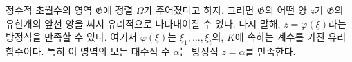 
정수적 초월수의 영역 $\mathfrak G$에 정렬 $\Omega$가 주어졌다고 하자. 그러면 $\mathfrak G$의 어떤 양 $z$가 $\mathfrak G$의 유한개의 앞선 양을 써서 유리적으로 나타내어질 수 있다. 다시 말해, $z=\varphi(\xi)$라는 방정식을 만족할 수 있다. 여기서 $\varphi(\xi)$는 $\xi_1,\ldots,\xi_t$의, $K$에 속하는 계수를 가진 유리함수이다. 특히 이 영역의 모든 대수적 수 $\alpha$는 방정식 $z=\alpha$를 만족한다.

